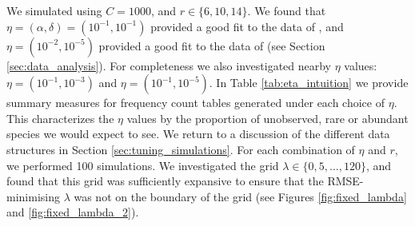 \documentclass[12pt]{article}
\begin{document}
We simulated using $C = 1000$, and $r \in \{6, 10, 14\}$.  We found that $\eta = (\alpha, \delta) = (10^{-1}, 10^{-1})$  provided a good fit to the data of  \citet{walsh2014restricted}, and $\eta = (10^{-2}, 10^{-5})$ provided a good fit to the data of \citet{tromas_2017} (see Section \ref{sec:data_analysis}).
For completeness we also investigated nearby $\eta$ values: $\eta = \left( 10^{-1}, 10^{-3} \right)$ and $\eta = \left( 10^{-1}, 10^{-5}\right)$.
In Table \ref{tab:eta_intuition} we provide  summary measures for frequency count tables generated under each choice of $\eta$.  This characterizes the $\eta$ values by the proportion of unobserved, rare or abundant species we would expect to see. We return to a discussion of the different data structures in Section \ref{sec:tuning_simulations}.
For each combination of $\eta$ and $r$, we performed 100 simulations.
We investigated the grid $\lambda \in \{0, 5, \dots , 120\}$, and found that this grid was sufficiently expansive to ensure that the RMSE-minimising $\lambda$ was not on the boundary of the grid
(see Figures \ref{fig:fixed_lambda} and \ref{fig:fixed_lambda_2}).
\end{document}
